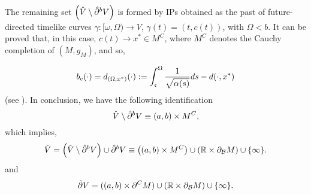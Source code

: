 
       The remaining set $\left(\hat{V}\setminus \hat{\partial}^{{\color{black} b}}V\right)$ is formed by IPs obtained as the past of future-directed timelike curves $\gamma:[\omega,\Omega)\rightarrow V$, $\gamma(t)=(t,c(t))$, with $\Omega<b$. It can be proved that, in this case, $c(t)\rightarrow x^*\in M^C$, where $M^C$ denotes the Cauchy completion of $(M,g_{M})$, and so,

         \begin{equation}
           \label{eq:46}
b_{c}(\cdot)=d_{(\Omega,x^*)}(\cdot):=\int_{\mathfrak{c}}^{\Omega}\frac{1}{\sqrt{\alpha(s)}}ds-d(\cdot,x^*)
         \end{equation}
(see \cite[(3.7)]{FHSIso2}). In conclusion, we have the following identification
       \begin{equation}
            \label{eq:19}
       \hat{V}\setminus \hat{\partial}^{{\color{black} b}}V\equiv (a,b) \times M^C,
          \end{equation}
          which implies,
          \[
\hat{V}=
\left(\hat{V}\setminus \hat{\partial}^{{\color{black} b}}V\right)\cup \hat{\partial}^{{\color{black} b}}V
\equiv
\left((a,b)\times M^C\right) \cup \left({\mathbb R}\times \partial_{\cal B} M \right) \cup \{\infty\}.
            \]
            and
            \[
            \hat{\partial}V=((a,b) \times\partial^C M)\cup ({\mathbb R}\times \partial_{{\cal B}}M)\cup \{\infty\}.
            \]

